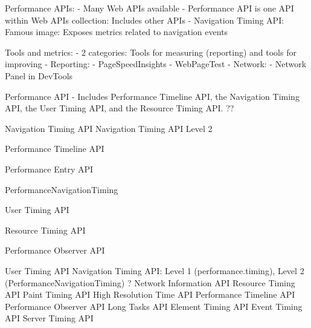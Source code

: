 Performance APIs:
- Many Web APIs available %
- Performance API is one API within Web APIs collection: Includes other APIs
- Navigation Timing API: Famous image: Exposes metrics related to navigation events

Tools and metrics:
- 2 categories: Tools for measuring (reporting) and tools for improving
- Reporting:
- PageSpeedInsights
- WebPageTest
- Network:
- Network Panel in DevTools





Performance API %
- Includes Performance Timeline API, the Navigation Timing API, the User Timing API, and the Resource Timing API.  ??



Navigation Timing API %
Navigation Timing API Level 2 %

Performance Timeline API %

Performance Entry API %

PerformanceNavigationTiming %



User Timing API %

Resource Timing API %



Performance Observer API %




User Timing API
Navigation Timing API: Level 1 (performance.timing), Level 2 (PerformanceNavigationTiming) ?
Network Information API
Resource Timing API
Paint Timing API
High Resolution Time API
Performance Timeline API
Performance Observer API
Long Tasks API
Element Timing API
Event Timing API
Server Timing API
















